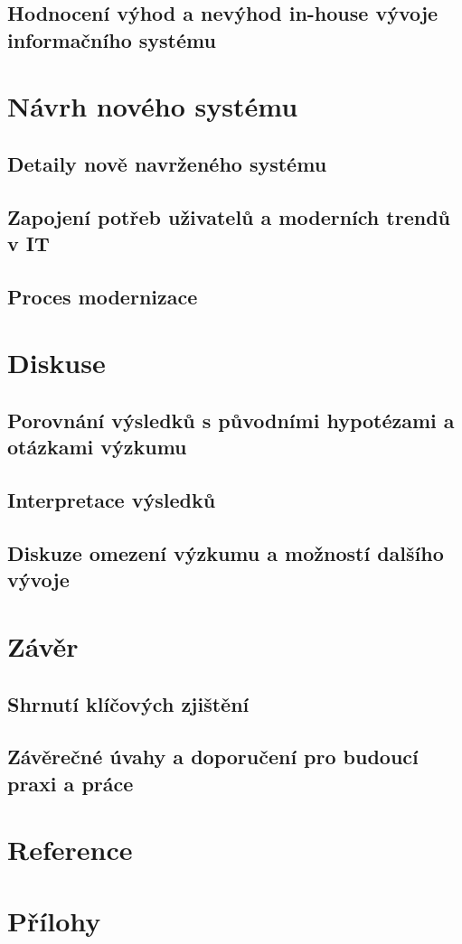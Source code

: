 \documentclass[FM,Proj]{tulthesis}
\begin{document}
\section{Hodnocení výhod a nevýhod in-house vývoje informačního systému}

\chapter{Návrh nového systému}
\section{Detaily nově navrženého systému}
\section{Zapojení potřeb uživatelů a moderních trendů v IT}
\section{Proces modernizace}

\chapter{Diskuse}
\section{Porovnání výsledků s původními hypotézami a otázkami výzkumu}
\section{Interpretace výsledků}
\section{Diskuze omezení výzkumu a možností dalšího vývoje}

\chapter{Závěr}
\section{Shrnutí klíčových zjištění}
\section{Závěrečné úvahy a doporučení pro budoucí praxi a práce}

\chapter{Reference}
\printbibliography[heading=none]

\chapter{Přílohy}
\end{document}
